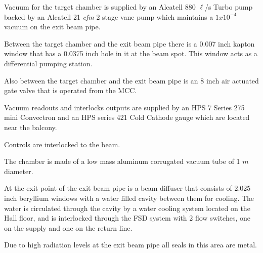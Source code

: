 {Vacuum for the target chamber is supplied by an Alcatell 880
$\ell$/s Turbo pump backed by an Alcatell 21 \emph{cfm} 2 stage vane pump
which maintains a $1x10^{-4}$ vacuum on the exit beam pipe.

Between the target chamber and the exit beam pipe there is a 0.007 inch
kapton window that has a 0.0375 inch hole in it at the beam spot.  This
window acts as a differential pumping station.

Also between the target chamber and the exit beam pipe is an 8 inch
air actuated gate valve that is operated from the MCC.

Vacuum readouts and interlocks outputs are supplied by an HPS 7 Series 
275 mini Convectron and an HPS series 421 Cold Cathode gauge
which are located near the balcony.

Controls are interlocked to the beam.

The chamber is made of a low mass aluminum corrugated vacuum tube of 1 
$m$ diameter.

At the exit point of the exit beam pipe is a beam diffuser that
consists of 2.025 inch beryllium windows with a water filled cavity between
them for cooling.  The water is circulated through the cavity by a
water cooling system located on the Hall floor, and is interlocked
through the FSD system with 2 flow switches, one on the supply and
one on the return line.

Due to high radiation levels at the exit beam pipe all seals in
this area are metal.
} %

